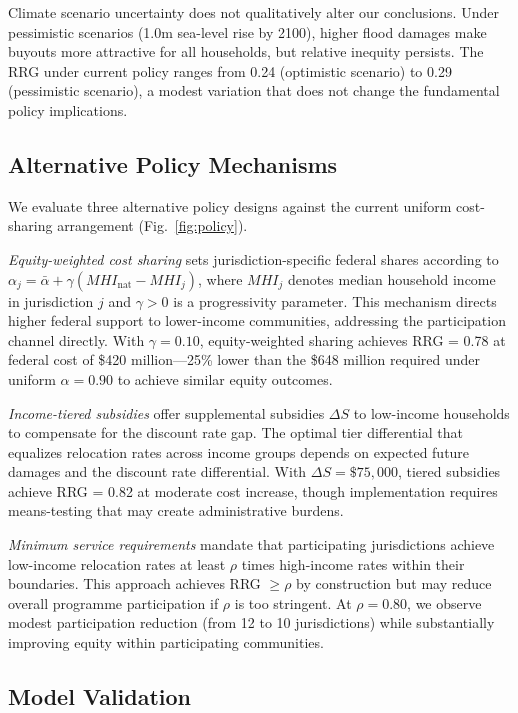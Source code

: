 \documentclass[11pt,letterpaper]{article}
\theoremstyle{definition}
\begin{document}
Climate scenario uncertainty does not qualitatively alter our conclusions. Under pessimistic scenarios (1.0m sea-level rise by 2100), higher flood damages make buyouts more attractive for all households, but relative inequity persists. The RRG under current policy ranges from 0.24 (optimistic scenario) to 0.29 (pessimistic scenario), a modest variation that does not change the fundamental policy implications.

\subsection{Alternative Policy Mechanisms}

We evaluate three alternative policy designs against the current uniform cost-sharing arrangement (Fig.~\ref{fig:policy}).

\textit{Equity-weighted cost sharing} sets jurisdiction-specific federal shares according to $\alpha_j = \bar{\alpha} + \gamma(MHI_{\text{nat}} - MHI_j)$, where $MHI_j$ denotes median household income in jurisdiction $j$ and $\gamma > 0$ is a progressivity parameter. This mechanism directs higher federal support to lower-income communities, addressing the participation channel directly. With $\gamma = 0.10$, equity-weighted sharing achieves RRG = 0.78 at federal cost of \$420 million---25\% lower than the \$648 million required under uniform $\alpha = 0.90$ to achieve similar equity outcomes.

\textit{Income-tiered subsidies} offer supplemental subsidies $\Delta S$ to low-income households to compensate for the discount rate gap. The optimal tier differential that equalizes relocation rates across income groups depends on expected future damages and the discount rate differential. With $\Delta S = \$75,000$, tiered subsidies achieve RRG = 0.82 at moderate cost increase, though implementation requires means-testing that may create administrative burdens.

\textit{Minimum service requirements} mandate that participating jurisdictions achieve low-income relocation rates at least $\rho$ times high-income rates within their boundaries. This approach achieves RRG $\geq \rho$ by construction but may reduce overall programme participation if $\rho$ is too stringent. At $\rho = 0.80$, we observe modest participation reduction (from 12 to 10 jurisdictions) while substantially improving equity within participating communities.

\subsection{Model Validation}
\end{document}
